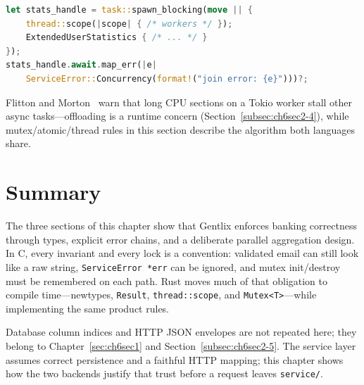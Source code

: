 \begin{lstlisting}[language=Rust, caption={transaction.rs (service) --- CPU work
offloaded from the Tokio worker.}]
let stats_handle = task::spawn_blocking(move || {
    thread::scope(|scope| { /* workers */ });
    ExtendedUserStatistics { /* ... */ }
});
stats_handle.await.map_err(|e|
    ServiceError::Concurrency(format!("join error: {e}")))?;
\end{lstlisting}

Flitton and Morton~\cite{Flitton2023}
warn that long CPU sections on a Tokio worker stall other async tasks---offloading is a
runtime concern (Section~\ref{subsec:ch6sec2-4}), while mutex/atomic/thread rules in this
section describe the algorithm both languages share.

\section*{Summary}

The three sections of this chapter show that Gentlix enforces banking correctness through
types, explicit error chains, and a deliberate parallel aggregation design. In C, every
invariant and every lock is a convention: validated email can still look like a raw
string, \texttt{ServiceError *err} can be ignored, and mutex init/destroy must be remembered
on each path. Rust moves much of that obligation to compile time---newtypes, \texttt{Result},
\texttt{thread::scope}, and \texttt{Mutex<T>}---while implementing the same product rules.

Database column indices and HTTP JSON envelopes are not repeated here; they belong to
Chapter~\ref{sec:ch6sec1} and Section~\ref{subsec:ch6sec2-5}. The service layer assumes
correct persistence and a faithful HTTP mapping; this chapter shows how the two backends
justify that trust before a request leaves \texttt{service/}.
